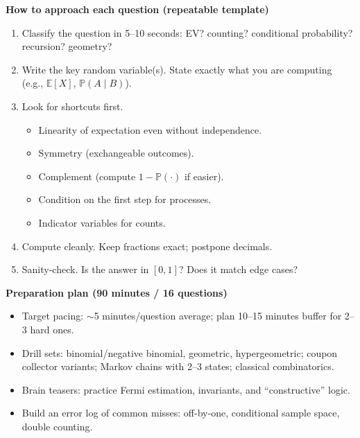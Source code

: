 \documentclass[11pt,letterpaper,openany]{book}
\begin{document}
\textbf{How to approach each question (repeatable template)}
\begin{enumerate}
  \item Classify the question in 5--10 seconds: EV? counting? conditional probability? recursion? geometry?
  \item Write the key random variable(s). State exactly what you are computing (e.g., $\mathbb{E}[X]$, $\mathbb{P}(A \mid B)$).
  \item Look for shortcuts first.
  \begin{itemize}
    \item Linearity of expectation even without independence.
    \item Symmetry (exchangeable outcomes).
    \item Complement (compute $1 - \mathbb{P}(\cdot)$ if easier).
    \item Condition on the first step for processes.
    \item Indicator variables for counts.
  \end{itemize}
  \item Compute cleanly. Keep fractions exact; postpone decimals.
  \item Sanity-check. Is the answer in $[0,1]$? Does it match edge cases?
\end{enumerate}

\textbf{Preparation plan (90 minutes / 16 questions)}
\begin{itemize}
  \item Target pacing: $\sim$5 minutes/question average; plan 10--15 minutes buffer for 2--3 hard ones.
  \item Drill sets: binomial/negative binomial, geometric, hypergeometric; coupon collector variants; Markov chains with 2--3 states; classical combinatorics.
  \item Brain teasers: practice Fermi estimation, invariants, and ``constructive'' logic.
  \item Build an error log of common misses: off-by-one, conditional sample space, double counting.
\end{itemize}
\end{document}
